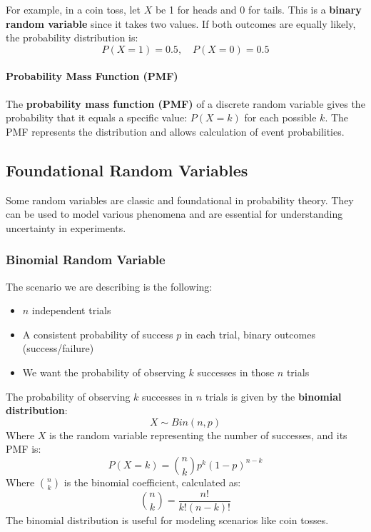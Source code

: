 For example, in a coin toss, let $X$ be 1 for heads and 0 for tails.
This is a \textbf{binary random variable} since it takes two values.
If both outcomes are equally likely, the probability distribution is:
\begin{equation}
    P(X=1) = 0.5, \quad P(X=0) = 0.5
\end{equation}

\paragraph{Probability Mass Function (PMF)}
The \textbf{probability mass function (PMF)} of a discrete random variable gives the probability that it equals a specific value: $P(X=k)$ for each possible $k$.
The PMF represents the distribution and allows calculation of event probabilities.

\subsection{Foundational Random Variables}
Some random variables are classic and foundational in probability theory.
They can be used to model various phenomena and are essential for understanding uncertainty in experiments.

\subsubsection{Binomial Random Variable}
The scenario we are describing is the following: 
\begin{itemize}
    \item $n$ independent trials
    \item A consistent probability of success $p$ in each trial, binary outcomes (success/failure)
    \item We want the probability of observing $k$ successes in those $n$ trials
\end{itemize}
The probability of observing $k$ successes in $n$ trials is given by the \textbf{binomial distribution}:
\begin{equation}
    X \sim Bin(n, p)
\end{equation}
Where $X$ is the random variable representing the number of successes, and its PMF is:
\begin{equation}
    P(X=k) = \binom{n}{k} p^k (1-p)^{n-k}
\end{equation}
Where $\binom{n}{k}$ is the binomial coefficient, calculated as:
\begin{equation}
    \binom{n}{k} = \frac{n!}{k!(n-k)!}
\end{equation}
The binomial distribution is useful for modeling scenarios like coin tosses.

